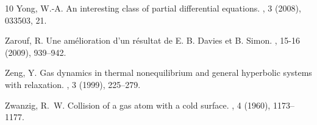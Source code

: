 \documentclass{article}
\theoremstyle{plain}%
\theoremstyle{definition}%
\theoremstyle{remark}%
\newcommand{\+}[1]{{\bm{#1}}}
\begin{document}
\begin{thebibliography}{10}
  {\sc Yong, W.-A.}
  \newblock An interesting class of partial differential equations.
  , 3 (2008), 033503, 21.
  
  {\sc Zarouf, R.}
  \newblock Une am\'{e}lioration d'un r\'{e}sultat de {E}. {B}. {D}avies et {B}.
    {S}imon.
  , 15-16 (2009), 939--942.
  
  {\sc Zeng, Y.}
  \newblock Gas dynamics in thermal nonequilibrium and general hyperbolic systems
    with relaxation.
  , 3 (1999), 225--279.
  
  {\sc Zwanzig, R.~W.}
  \newblock Collision of a gas atom with a cold surface.
  , 4 (1960), 1173--1177.
  
  \end{thebibliography}
  
\end{document}
